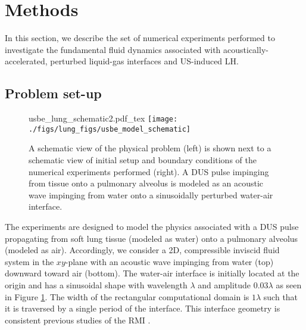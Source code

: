 \section{Methods} \label{sec:usbe_lung_methods}%
In this section, we describe the set of numerical experiments
performed to investigate the fundamental fluid dynamics associated
with acoustically-accelerated, perturbed liquid-gas interfaces and
\ac{US}-induced \ac{LH}.

\subsection{Problem set-up}
\label{subsec:setup}
\begin{figure}[t]
  \centering

  \def\svgwidth{0.48\textwidth}
  {usbe_lung_schematic2.pdf_tex} \hfill%
  \texttt{[image: ./figs/lung\_figs/usbe\_model\_schematic]} \hfill
  \caption[A schematic view of lung \ac{DUS} and the model problem]{A schematic view of the physical problem (left) is shown next
    to a schematic view of initial setup and boundary conditions of the
    numerical experiments performed (right). A \ac{DUS} pulse impinging
    from tissue onto a pulmonary alveolus is modeled as an acoustic wave
    impinging from water onto a sinusoidally perturbed water-air interface.}
  \label{fig:lung_schematic}
\end{figure}
The experiments are designed to model the physics associated with a
\ac{DUS} pulse propagating from soft lung tissue (modeled as water)
onto a pulmonary alveolus (modeled as air). Accordingly, we consider a
2D, compressible inviscid fluid system in the $xy$-plane with an
acoustic wave impinging from water (top) downward toward air
(bottom). The water-air interface is initially located at the origin
and has a sinusoidal shape with wavelength $\lambda$ and amplitude
$0.03\lambda$ as seen in Figure \ref{fig:lung_schematic}. The width
of the rectangular computational domain is $1\lambda$ such that it is
traversed by a single period of the interface. This interface geometry
is consistent previous studies of the \ac{RMI}
\citep{Brouillette2002}.

